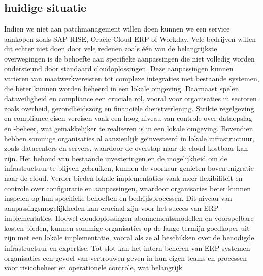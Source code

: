 \documentclass[dutch,dit,thesis]{hogentreport}
\begin{document}
\chapter{}
\label{ch:corpus}

\section{huidige situatie}

Indien we niet aan patchmanagement willen doen kunnen we een service aankopen zoals SAP RISE, Oracle Cloud ERP of Workday. Vele bedrijven willen dit echter niet doen door vele
 redenen zoals één van de belangrijkste overwegingen is de behoefte aan specifieke aanpassingen die niet volledig worden ondersteund door standaard cloudoplossingen. 
 Deze aanpassingen kunnen variëren van maatwerkvereisten tot complexe integraties met bestaande systemen, die beter kunnen worden beheerd in een lokale omgeving.
Daarnaast spelen dataveiligheid en compliance een cruciale rol, vooral voor organisaties in sectoren zoals overheid, gezondheidszorg en financiële dienstverlening.
 Strikte regelgeving en compliance-eisen vereisen vaak een hoog niveau van controle over dataopslag en -beheer, wat gemakkelijker te realiseren is in een lokale omgeving.
Bovendien hebben sommige organisaties al aanzienlijk geïnvesteerd in lokale infrastructuur, zoals datacenters en servers, waardoor de overstap naar de cloud kostbaar kan zijn.
 Het behoud van bestaande investeringen en de mogelijkheid om de infrastructuur te blijven gebruiken, kunnen de voorkeur genieten boven migratie naar de cloud.
Verder bieden lokale implementaties vaak meer flexibiliteit en controle over configuratie en aanpassingen, waardoor organisaties beter kunnen inspelen op hun specifieke behoeften en 
bedrijfsprocessen. Dit niveau van aanpassingsmogelijkheden kan cruciaal zijn voor het succes van ERP-implementaties.
Hoewel cloudoplossingen abonnementsmodellen en voorspelbare kosten bieden, kunnen sommige organisaties op de lange termijn goedkoper uit zijn met een lokale implementatie, vooral als
 ze al beschikken over de benodigde infrastructuur en expertise.
Tot slot kan het intern beheren van ERP-systemen organisaties een gevoel van vertrouwen geven in hun eigen teams en processen voor risicobeheer en operationele controle, wat belangrijk 
\end{document}
